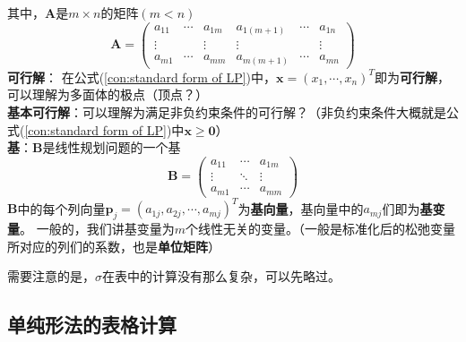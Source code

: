 \documentclass{book}
\begin{document}
其中，$\boldsymbol{A}$是$m\times n$的矩阵$(m<n)$
$$\boldsymbol{A}=
\begin{pmatrix}
    a_{11} & \cdots & a_{1m} & a_{1(m+1)} & \cdots & a_{1n} \\
    \vdots & & \vdots & \vdots & & \vdots\\
    a_{m1} & \cdots & a_{mm} & a_{m(m+1)} & \cdots & a_{mn}
\end{pmatrix}
$$
\textbf{可行解}：
在公式(\ref{con:standard form of LP})中，$\boldsymbol{x}=(x_1, \cdots, x_n)^T$即为\textbf{可行解}，可以理解为多面体的极点（顶点？）\\
\textbf{基本可行解}：可以理解为满足非负约束条件的可行解？（非负约束条件大概就是公式(\ref{con:standard form of LP})中$\boldsymbol{x\ge0}$）\\
\textbf{基}：$\boldsymbol{B}$是线性规划问题的一个基
$$\boldsymbol{B}=
\begin{pmatrix}
    a_{11} & \cdots & a_{1m}\\
    \vdots & \ddots & \vdots\\
    a_{m1} & \cdots & a_{mm}
\end{pmatrix}$$
$\boldsymbol{B}$中的每个列向量$\boldsymbol{p}_j=(a_{1j}, a_{2j}, \cdots, a_{mj})^T$为\textbf{基向量}，基向量中的$a_{mj}$们即为\textbf{基变量}。
一般的，我们讲基变量为$m$个线性无关的变量。（一般是标准化后的松弛变量所对应的列们的系数，也是\textbf{单位矩阵}）



需要注意的是，$\sigma$在表中的计算没有那么复杂，可以先略过。

\subsection{单纯形法的表格计算}
\end{document}

